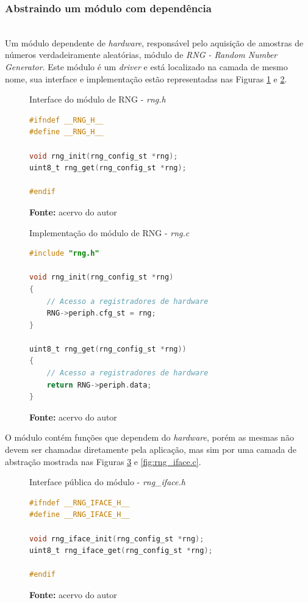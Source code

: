\documentclass[times, twoside, watermark]{artigo}
\begin{document}
\subsubsection{Abstraindo um módulo com dependência}\hfill\\

Um módulo dependente de \textit{hardware}, responsável pelo aquisição de amostras
de números verdadeiramente aleatórias, módulo de \textit{RNG - Random Number 
Generator}.
Este módulo é um \textit{driver} e está localizado na camada de mesmo nome, sua 
interface e implementação estão representadas
nas Figuras \ref{fig:rng.h} e \ref{fig:rng.c}.\hfill\

\begin{figure}[H]
  \centering
  \caption{Interface do módulo de RNG - \textit{rng.h}}
\begin{lstlisting}[language=C]
#ifndef __RNG_H__
#define __RNG_H__

void rng_init(rng_config_st *rng);
uint8_t rng_get(rng_config_st *rng);

#endif
\end{lstlisting}
  \label{fig:rng.h}
  \caption*{\newline\textbf{Fonte:} acervo do autor}
\end{figure}


\begin{figure}[H]
  \centering
  \caption{Implementação do módulo de RNG - \textit{rng.c}}
\begin{lstlisting}[language=C]
#include "rng.h"

void rng_init(rng_config_st *rng)
{
    // Acesso a registradores de hardware
    RNG->periph.cfg_st = rng;
}

uint8_t rng_get(rng_config_st *rng))
{
    // Acesso a registradores de hardware
    return RNG->periph.data;
}

\end{lstlisting}
  \label{fig:rng.c}
  \caption*{\newline\textbf{Fonte:} acervo do autor}
\end{figure}

O módulo contém funções que dependem do \textit{hardware}, porém as mesmas não
devem ser chamadas diretamente pela aplicação, mas sim por uma camada de abstração
mostrada nas Figuras \ref{fig:rng_iface.h} e \ref{fig:rng_iface.c}.\hfill\\

\begin{figure}[H]
  \centering
  \caption{Interface pública do módulo - \textit{rng\_iface.h}}
\begin{lstlisting}[language=C]
#ifndef __RNG_IFACE_H__
#define __RNG_IFACE_H__

void rng_iface_init(rng_config_st *rng);
uint8_t rng_iface_get(rng_config_st *rng);

#endif
\end{lstlisting}
  \label{fig:rng_iface.h}
  \caption*{\newline\textbf{Fonte:} acervo do autor}
\end{figure}
\end{document}
